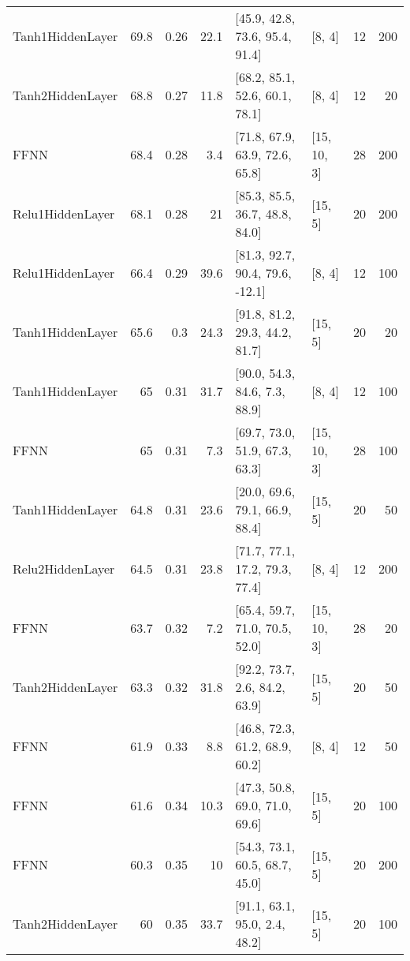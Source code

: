 \begin{table*}
\begin{tabular}{lrrrllrr}
 Tanh1HiddenLayer   & 69.8 &  0.26 &     22.1 & [45.9, 42.8, 73.6, 95.4, 91.4]  & [8, 4]         &         12 &      200 \\
 Tanh2HiddenLayer   & 68.8 &  0.27 &     11.8 & [68.2, 85.1, 52.6, 60.1, 78.1]  & [8, 4]         &         12 &       20 \\
 FFNN               & 68.4 &  0.28 &      3.4 & [71.8, 67.9, 63.9, 72.6, 65.8]  & [15, 10, 3]    &         28 &      200 \\
 Relu1HiddenLayer   & 68.1 &  0.28 &     21   & [85.3, 85.5, 36.7, 48.8, 84.0]  & [15, 5]        &         20 &      200 \\
 Relu1HiddenLayer   & 66.4 &  0.29 &     39.6 & [81.3, 92.7, 90.4, 79.6, -12.1] & [8, 4]         &         12 &      100 \\
 Tanh1HiddenLayer   & 65.6 &  0.3  &     24.3 & [91.8, 81.2, 29.3, 44.2, 81.7]  & [15, 5]        &         20 &       20 \\
 Tanh1HiddenLayer   & 65   &  0.31 &     31.7 & [90.0, 54.3, 84.6, 7.3, 88.9]   & [8, 4]         &         12 &      100 \\
 FFNN               & 65   &  0.31 &      7.3 & [69.7, 73.0, 51.9, 67.3, 63.3]  & [15, 10, 3]    &         28 &      100 \\
 Tanh1HiddenLayer   & 64.8 &  0.31 &     23.6 & [20.0, 69.6, 79.1, 66.9, 88.4]  & [15, 5]        &         20 &       50 \\
 Relu2HiddenLayer   & 64.5 &  0.31 &     23.8 & [71.7, 77.1, 17.2, 79.3, 77.4]  & [8, 4]         &         12 &      200 \\
 FFNN               & 63.7 &  0.32 &      7.2 & [65.4, 59.7, 71.0, 70.5, 52.0]  & [15, 10, 3]    &         28 &       20 \\
 Tanh2HiddenLayer   & 63.3 &  0.32 &     31.8 & [92.2, 73.7, 2.6, 84.2, 63.9]   & [15, 5]        &         20 &       50 \\
 FFNN               & 61.9 &  0.33 &      8.8 & [46.8, 72.3, 61.2, 68.9, 60.2]  & [8, 4]         &         12 &       50 \\
 FFNN               & 61.6 &  0.34 &     10.3 & [47.3, 50.8, 69.0, 71.0, 69.6]  & [15, 5]        &         20 &      100 \\
 FFNN               & 60.3 &  0.35 &     10   & [54.3, 73.1, 60.5, 68.7, 45.0]  & [15, 5]        &         20 &      200 \\
 Tanh2HiddenLayer   & 60   &  0.35 &     33.7 & [91.1, 63.1, 95.0, 2.4, 48.2]   & [15, 5]        &         20 &      100 \\

\end{tabular}
\end{table*}
